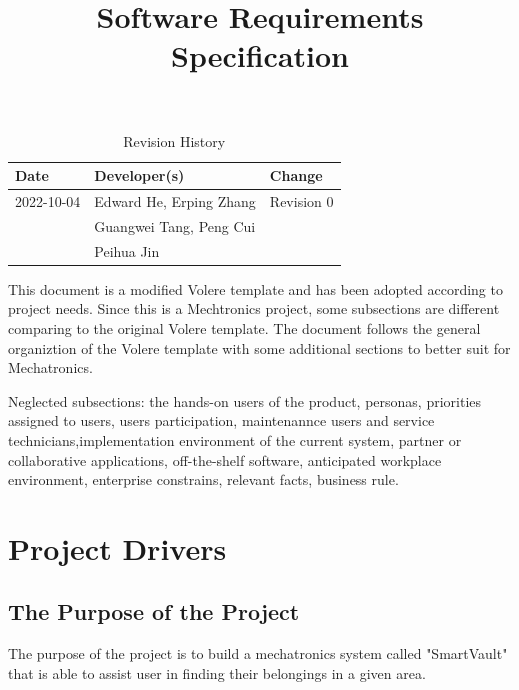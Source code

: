 \documentclass[12pt]{article}
\title{Software Requirements Specification\\\progname}
\author{\authname}
\date{}
\begin{document}
\maketitle

\newpage
\begin{table}[hp]
\caption{Revision History} \label{TblRevisionHistory}
\begin{tabularx}{\textwidth}{llX}
\toprule
\textbf{Date} & \textbf{Developer(s)} & \textbf{Change}\\
\midrule
2022-10-04 & Edward He, Erping Zhang & Revision 0\\
& Guangwei Tang, Peng Cui & \\
& Peihua Jin & \\
\bottomrule
\end{tabularx}
\end{table}


This document is a modified Volere template and has been adopted according to project needs. Since this is a Mechtronics project, some subsections are different comparing to the original Volere template. The document follows the general organiztion of the Volere template with some additional sections to better suit for Mechatronics. 

Neglected subsections: the hands-on users of the product, personas, priorities assigned to users, users participation, maintenannce users and service technicians,implementation environment of the current system, partner or collaborative applications, off-the-shelf software, anticipated workplace environment, enterprise constrains, relevant facts, business rule.
\newpage


\tableofcontents

\newpage



\listoftables
\listoffigures

\newpage




\begin{table}

\end{table}

\section{Project Drivers}

\subsection{The Purpose of the Project}
The purpose of the project is to build a mechatronics system called "SmartVault" that is able to assist user in finding their belongings in a given area. 
\end{document}
